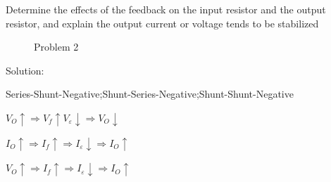 \documentclass[a4paper,11pt,UTF8]{article}
\begin{document}
 Determine the effects of the feedback on the input resistor and the output resistor, and explain the output current or voltage tends to be stabilized
\begin{figure}[H]
	\caption{Problem 2}
\end{figure}
\noindent Solution:

 Series-Shunt-Negative;Shunt-Series-Negative;Shunt-Shunt-Negative

$V_O\uparrow\Rightarrow V_{f}\uparrow V_{\varepsilon}\downarrow\Rightarrow V_O\downarrow$

$I_O\uparrow\Rightarrow I_{f}\uparrow\Rightarrow I_{\varepsilon}\downarrow\Rightarrow I_O\uparrow$

$V_O\uparrow\Rightarrow I_{f}\uparrow\Rightarrow I_{\varepsilon}\downarrow\Rightarrow I_O\uparrow$
\end{document}
